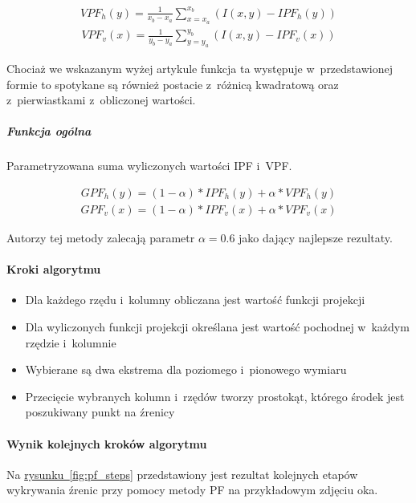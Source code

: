 \begin{align}
    {VPF_h}(y)=\frac{1}{{x_b}-{x_a}}\sum_{x={x_a}}^{{x_b}} (I(x,y) - {IPF_h(y)})
\end{align}
\begin{align}
    {VPF_v}(x)=\frac{1}{{y_b}-{y_a}}\sum_{y={y_a}}^{{y_b}} (I(x,y) - {IPF_v(x)})
\end{align}

Chociaż we wskazanym wyżej artykule funkcja ta występuje w~przedstawionej formie to spotykane są również postacie z~różnicą kwadratową oraz z~pierwiastkami z~obliczonej wartości. 

\subparagraph{Funkcja ogólna} Parametryzowana suma wyliczonych wartości IPF i~VPF.

\begin{align}
    {GPF_h}(y)=(1-\alpha) * {IPF_h(y)} + \alpha * {VPF_h(y)}
\end{align}
\begin{align}
    {GPF_v}(x)=(1-\alpha) * {IPF_v(x)} + \alpha * {VPF_v(x)} 
\end{align}

Autorzy tej metody zalecają parametr $\alpha = 0.6$ jako dający najlepsze rezultaty.

\paragraph{Kroki algorytmu}

\begin{itemize}
    \item Dla każdego rzędu i~kolumny obliczana jest wartość funkcji projekcji
    \item Dla wyliczonych funkcji projekcji określana jest wartość pochodnej w~każdym rzędzie i~kolumnie
    \item Wybierane są dwa ekstrema dla poziomego i~pionowego wymiaru
    \item Przecięcie wybranych kolumn i~rzędów tworzy prostokąt, którego środek jest poszukiwany punkt na źrenicy 
\end{itemize}

\paragraph{Wynik kolejnych kroków algorytmu}
Na \hyperref[{fig:pf_steps}]{rysunku~\ref{fig:pf_steps}} przedstawiony jest rezultat kolejnych etapów wykrywania źrenic przy pomocy metody PF na przykładowym zdjęciu oka.

